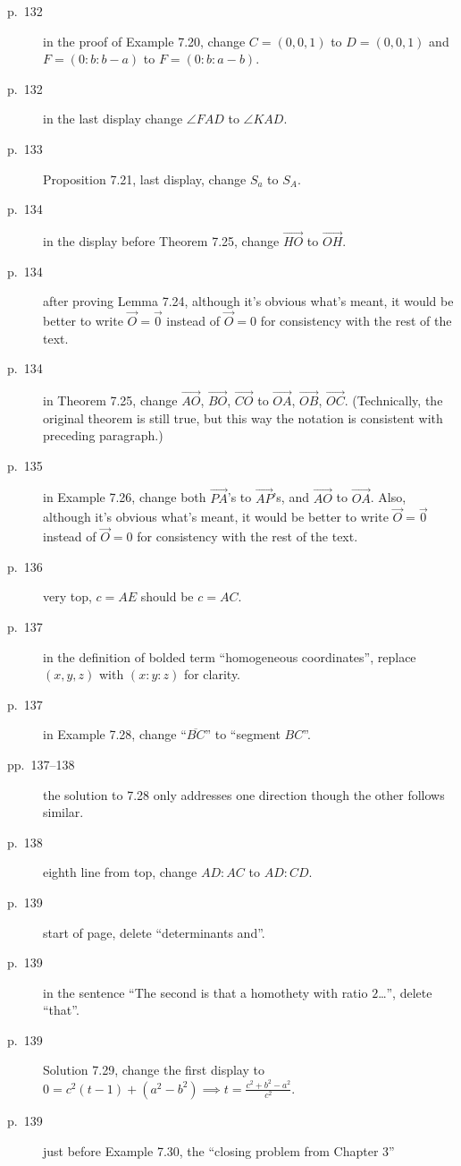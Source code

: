 \documentclass[11pt]{scrartcl}
\begin{document}
\begin{description}
\item[p.\  132] in the proof of Example 7.20, change $C = (0, 0, 1)$ to $D = (0, 0, 1)$
  and $F = (0 : b : b - a)$ to $F = (0 : b : a - b)$.
\item[p.\  132] in the last display change $\angle FAD$ to $\angle KAD$.
\item[p.\  133] Proposition 7.21, last display, change $S_a$ to $S_A$.
\item[p.\  134] in the display before Theorem 7.25,
  change $\overrightarrow{HO}$ to $\overrightarrow{OH}$.
\item[p.\  134] after proving Lemma 7.24,
  although it's obvious what's meant, it would be better to write $\vec O = \vec 0$
  instead of $\vec O = 0$ for consistency with the rest of the text.
\item[p.\  134] in Theorem 7.25, change
  $\overrightarrow{AO}$, $\overrightarrow{BO}$, $\overrightarrow{CO}$ to
  $\overrightarrow{OA}$, $\overrightarrow{OB}$, $\overrightarrow{OC}$.
  (Technically, the original theorem is still true,
  but this way the notation is consistent with preceding paragraph.)
\item[p.\  135] in Example 7.26, change both $\overrightarrow{PA}$'s to $\overrightarrow{AP}$'s,
  and $\overrightarrow{AO}$ to $\overrightarrow{OA}$.
  Also, although it's obvious what's meant, it would be better to write $\vec O = \vec 0$
  instead of $\vec O = 0$ for consistency with the rest of the text.
\item[p.\  136] very top, $c=AE$ should be $c=AC$.
\item[p.\  137] in the definition of bolded term ``homogeneous coordinates'',
  replace $(x,y,z)$ with $(x:y:z)$ for clarity.
\item[p.\  137] in Example 7.28, change ``$\overline{BC}$'' to ``segment $BC$''.
\item[pp.\  137--138] the solution to 7.28 only addresses one direction
  though the other follows similar.
\item[p.\  138] eighth line from top, change $AD:AC$ to $AD:CD$.
\item[p.\  139] start of page, delete ``determinants and''.
\item[p.\  139] in the sentence ``The second is that a homothety with ratio $2$\dots'', delete ``that''.
\item[p.\  139] Solution 7.29, change the first display to
  $0 = c^2(t-1) + (a^2-b^2) \implies t = \frac{c^2+b^2-a^2}{c^2}$.
\item[p.\  139] just before Example 7.30, the ``closing problem from Chapter 3''

\end{description}
\end{document}
